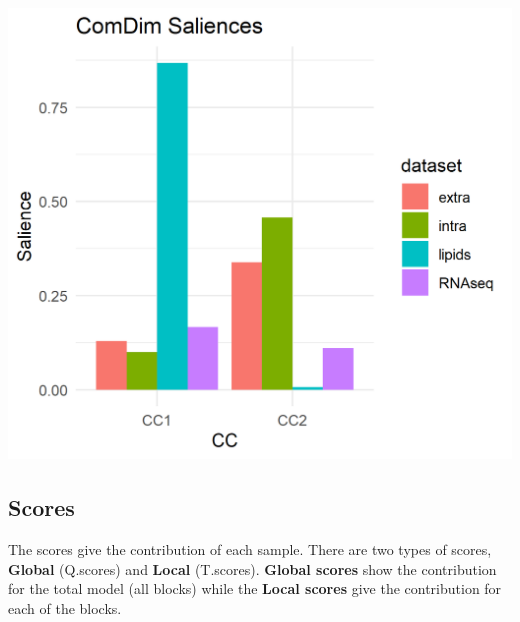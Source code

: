 \documentclass[
]{book}
\begin{document}
\includegraphics{Figs/fig1.png}

\hypertarget{Scores}{%
\subsection{Scores}\label{Scores}}

The scores give the contribution of each sample. There are two types of scores,
\textbf{Global} (Q.scores) and \textbf{Local} (T.scores). \textbf{Global scores} show the
contribution for the total model (all blocks) while the \textbf{Local scores} give
the contribution for each of the blocks.
\end{document}
